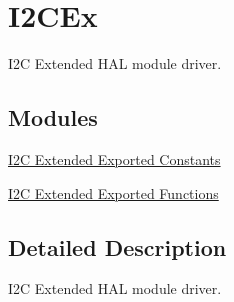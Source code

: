 \hypertarget{group___i2_c_ex}{}\section{I2\+C\+Ex}
\label{group___i2_c_ex}


I2C Extended H\+AL module driver.  


\subsection*{Modules}
\begin{DoxyCompactItemize}
\item 
\hyperlink{group___i2_c_ex___exported___constants}{I2\+C Extended Exported Constants}
\item 
\hyperlink{group___i2_c_ex___exported___functions}{I2\+C Extended Exported Functions}
\end{DoxyCompactItemize}


\subsection{Detailed Description}
I2C Extended H\+AL module driver. 

